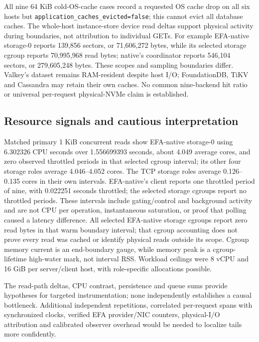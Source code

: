 All nine 64 KiB cold-OS-cache cases record a requested OS cache drop on all six hosts but \texttt{application\_\allowbreak caches\_\allowbreak evicted=false}; this cannot evict all database caches. The whole-host instance-store device read deltas support physical activity during boundaries, not attribution to individual GETs. For example EFA-native storage-0 reports 139,856 sectors, or 71,606,272 bytes, while its selected storage cgroup reports 70,995,968 read bytes; native's coordinator reports 546,104 sectors, or 279,605,248 bytes. These scopes and sampling boundaries differ. Valkey's dataset remains RAM-resident despite host I/O; FoundationDB, TiKV and Cassandra may retain their own caches. No common nine-backend hit ratio or universal per-request physical-NVMe claim is established.

\subsection{Resource signals and cautious interpretation}\label{obs-resource}
Matched primary 1 KiB concurrent reads show EFA-native storage-0 using 6.302326 CPU seconds over 1.556699393 seconds, about 4.049 average cores, and zero observed throttled periods in that selected cgroup interval; its other four storage roles average 4.046--4.052 cores. The TCP storage roles average 0.126--0.135 cores in their own intervals. EFA-native's client reports one throttled period of nine, with 0.022251 seconds throttled; the selected storage cgroups report no throttled periods. These intervals include gating/control and background activity and are not CPU per operation, instantaneous saturation, or proof that polling caused a latency difference. All selected EFA-native storage cgroups report zero read bytes in that warm boundary interval; that cgroup accounting does not prove every read was cached or identify physical reads outside its scope. Cgroup memory current is an end-boundary gauge, while memory peak is a cgroup-lifetime high-water mark, not interval RSS. Workload ceilings were 8 vCPU and 16 GiB per server/client host, with role-specific allocations possible.

The read-path deltas, CPU contrast, persistence and queue sums provide hypotheses for targeted instrumentation; none independently establishes a causal bottleneck. Additional independent repetitions, correlated per-request spans with synchronized clocks, verified EFA provider/NIC counters, physical-I/O attribution and calibrated observer overhead would be needed to localize tails more confidently.
